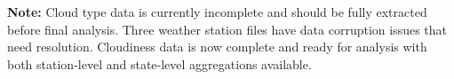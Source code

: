 \documentclass[11pt,a4paper]{article}
\begin{document}
\textbf{Note:} Cloud type data is currently incomplete and should be fully extracted before final analysis. Three weather station files have data corruption issues that need resolution. Cloudiness data is now complete and ready for analysis with both station-level and state-level aggregations available.
\end{document}

